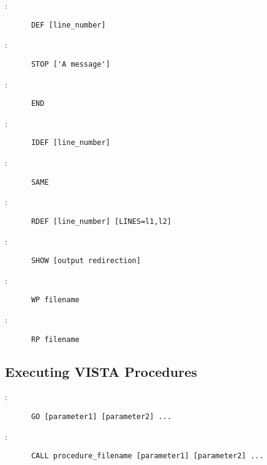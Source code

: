 \noindent {}:
\begin{verbatim}
      DEF [line_number]
\end{verbatim}

\noindent {}:
\begin{verbatim}
      STOP ['A message']
\end{verbatim}

\noindent {}:
\begin{verbatim}
      END
\end{verbatim}

\noindent {}:
\begin{verbatim}
      IDEF [line_number]
\end{verbatim}

\noindent {}:
\begin{verbatim}
      SAME
\end{verbatim}

\noindent {}:
\begin{verbatim}
      RDEF [line_number] [LINES=l1,l2]
\end{verbatim}

\noindent {}:
\begin{verbatim}
      SHOW [output redirection]
\end{verbatim}

\noindent {}:
\begin{verbatim}
      WP filename
\end{verbatim}

\noindent {}:
\begin{verbatim}
      RP filename
\end{verbatim}

\subsection{Executing VISTA Procedures}

:
\begin{verbatim}
      GO [parameter1] [parameter2] ...
\end{verbatim}

\noindent {}:
\begin{verbatim}
      CALL procedure_filename [parameter1] [parameter2] ...
\end{verbatim}

